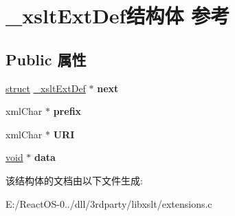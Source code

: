 \hypertarget{struct__xslt_ext_def}{}\section{\+\_\+xslt\+Ext\+Def结构体 参考}
\label{struct__xslt_ext_def}
\subsection*{Public 属性}
\begin{DoxyCompactItemize}
\item 
\mbox{\label{struct__xslt_ext_def_a1e92acc3039d10ba19b363ee8814cedb}} 
\hyperlink{interfacestruct}{struct} \hyperlink{struct__xslt_ext_def}{\+\_\+xslt\+Ext\+Def} $\ast$ {\bfseries next}
\item 
\mbox{\label{struct__xslt_ext_def_aa28a472fd528be58e3210315927edb8e}} 
xml\+Char $\ast$ {\bfseries prefix}
\item 
\mbox{\label{struct__xslt_ext_def_a0b3dee2abc0cbbf00f37a4be7dded8ab}} 
xml\+Char $\ast$ {\bfseries U\+RI}
\item 
\mbox{\label{struct__xslt_ext_def_a415a4a25b205522869f5230b20bfcf67}} 
\hyperlink{interfacevoid}{void} $\ast$ {\bfseries data}
\end{DoxyCompactItemize}


该结构体的文档由以下文件生成\+:\begin{DoxyCompactItemize}
\item 
E\+:/\+React\+O\+S-\/0../dll/3rdparty/libxslt/extensions.\+c\end{DoxyCompactItemize}
